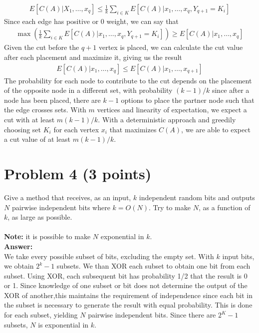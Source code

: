 \documentclass[letterpaper, 11pt]{article}
\begin{document}
\begin{align}
E[C(A)|X_1,\dots,x_q] \leq \frac{1}{k} \sum_{i \in K} E[C(A)|x_1,\dots,x_q,Y_{q+1} = K_i]
\end{align}
Since each edge has positive or 0 weight, we can say that
\begin{align}
\max \left(\frac{1}{k} \sum_{i \in K} E[C(A)|x_1,\dots,x_q,Y_{q+1} = K_i]\right) \geq E[C(A)|x_1,\dots,x_q]
\end{align}
Given the cut before the $q+1$ vertex is placed, we can calculate the cut value after each placement and maximize it, giving us the result
\begin{align}
E[C(A)|x_1,\dots,x_q] \leq E[C(A)|x_1,\dots,x_{q+1}]
\end{align}The probability for each node to contribute to the cut depends on the placement of the opposite node in a different set, with probability $(k-1)/k$ since after a node has been placed, there are $k-1$ options to place the partner node such that the edge crosses sets. With $m$ vertices and linearity of expectation, we expect a cut with at least $m(k-1)/k$. With a deterministic approach and greedily choosing set $K_i$ for each vertex $x_i$ that maximizes $C(A)$, we are able to expect a cut value of at least $m(k-1)/k$.

\pagebreak
\section*{Problem 4 (3 points)}
Give a method that receives, as an input, $k$ independent random bits and outputs $N$ pairwise independent bits where $k = O(N)$. Try to make $N$, as a function of $k$, as large as possible. \\ \\
\textbf{Note:} it is possible to make $N$ exponential in $k$. \\
\textbf{Answer:} \\
We take every possible subset of bits, excluding the empty set. With $k$ input bits, we obtain $2^k - 1$ subsets. We than XOR each subset to obtain one bit from each subset. Using XOR, each subsequent bit has probability 1/2 that the result is 0 or 1. Since knowledge of one subset or bit does not determine the output of the XOR of another,this maintains the requirement of independence since each bit in the subset is necessary to generate the result with equal probability. This is done for each subset, yielding $N$ pairwise independent bits. Since there are $2^K - 1$ subsets, $N$ is exponential in $k$.
\pagebreak
\end{document}

